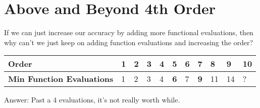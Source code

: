 \documentclass[a4paper,12pt]{report}
\begin{document}
\section{Above and Beyond 4th Order}
If we can just increase our accuracy by adding more functional evaluations, then why can't we just keep on 
adding function evaluations and increasing the order?

\begin{tabular}{l|llllllllll}
\textbf{Order} & 1 & 2 & 3 & 4 & 5 & 6 & 7 & 8 & 9 & 10 \\
\hline
\textbf{Min Function Evaluations} & 1 & 2 & 3 & 4 & \textbf{6} & 7 & \textbf{9} & 11 & 14 & ? \\
\end{tabular}

Answer: Past a 4 evaluations, it's not really worth while.
\end{document}
